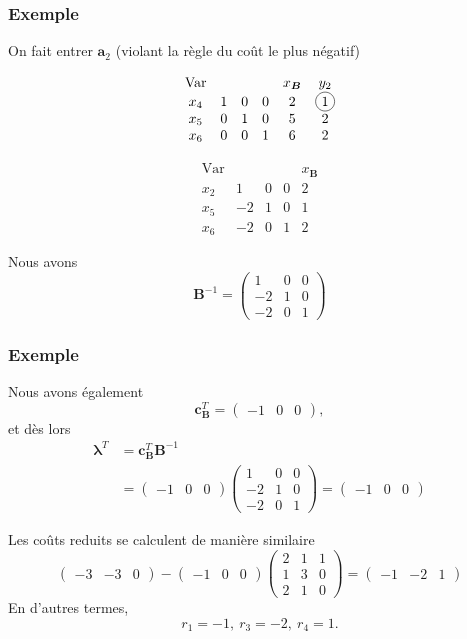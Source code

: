 \documentclass[usepdftitle=false]{beamer}
\newcommand*\circled[1]{\tikz[baseline=(char.base)]{
    \node[shape=circle,draw,inner sep=2pt] (char) {#1};}}
\def\ba{\boldsymbol{a}}
\def\bc{\boldsymbol{c}}
\def\bB{\boldsymbol{B}}
\def\blambda{\boldsymbol{\lambda}}
\begin{document}
\begin{frame}
\frametitle{Exemple}

On fait entrer $\ba_2$ (violant la règle du coût le plus négatif)

\[
\begin{matrix}
\mbox{Var} & & & & x_{\bB} & y_2 \\
x_4 & 1 & 0 & 0 & 2 & \circled{1} \\
x_5 & 0 & 1 & 0 & 5 & 2 \\
x_6 & 0 & 0 & 1 & 6 & 2
\end{matrix}
\]

\mbox{}

\[
\begin{matrix}
\mbox{Var} & & & & x_{\bB} \\
x_2 & 1 & 0 & 0 & 2 \\
x_5 & -2 & 1 & 0 & 1 \\
x_6 & -2 & 0 & 1 & 2
\end{matrix}
\]

\mbox{}

Nous avons
\[
\bB^{-1} =
\begin{pmatrix}
1 & 0 & 0 \\
-2 & 1 & 0 \\
-2 & 0 & 1
\end{pmatrix}
\]

\end{frame}

\begin{frame}
\frametitle{Exemple}

Nous avons également
\[
\bc_{\bB}^T =
\begin{pmatrix}
 -1 & 0 & 0
\end{pmatrix},
\]
et dès lors
\begin{align*}
\blambda^T &= \bc_{\bB}^T \bB^{-1} \\
&=
\begin{pmatrix}
 -1 & 0 & 0
\end{pmatrix}
\begin{pmatrix}
1 & 0 & 0 \\
-2 & 1 & 0 \\
-2 & 0 & 1
\end{pmatrix}
=
\begin{pmatrix}
-1 & 0 & 0
\end{pmatrix}
\end{align*}

\mbox{}

Les coûts reduits se calculent de manière similaire
\[
\begin{pmatrix}
-3 & -3 & 0
\end{pmatrix}
- \begin{pmatrix}
-1 & 0 & 0
\end{pmatrix}
\begin{pmatrix}
2 & 1 & 1 \\
1 & 3 & 0 \\
2 & 1 & 0
\end{pmatrix}
=
\begin{pmatrix}
-1 & -2 & 1
\end{pmatrix}
\]
En d'autres termes,
\[
r_1 = -1,\ r_3 = -2,\ r_4 = 1.
\]

\end{frame}
\end{document}
